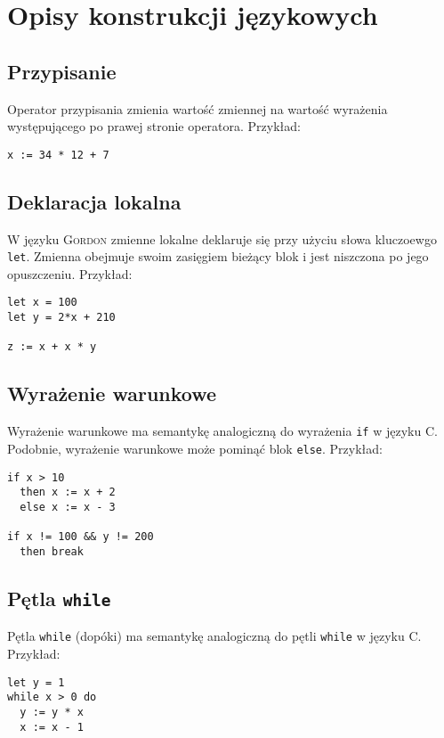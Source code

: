 \documentclass{documentation}
\begin{document}
\section{Opisy konstrukcji językowych}

\subsection{Przypisanie}
Operator przypisania zmienia wartość zmiennej na wartość wyrażenia występującego
po prawej stronie operatora. Przykład:
\begin{verbatim}
x := 34 * 12 + 7
\end{verbatim}

\subsection{Deklaracja lokalna}
W języku \textsc{Gordon} zmienne lokalne deklaruje się przy użyciu słowa kluczoewgo
\texttt{let}. Zmienna obejmuje swoim zasięgiem bieżący blok i jest niszczona po
jego opuszczeniu. Przykład:

\begin{verbatim}
let x = 100
let y = 2*x + 210

z := x + x * y
\end{verbatim}

\subsection{Wyrażenie warunkowe}
Wyrażenie warunkowe ma semantykę analogiczną do wyrażenia \texttt{if}
w języku \textsc{C}. Podobnie, wyrażenie warunkowe może pominąć blok \texttt{else}.
Przykład:

\begin{verbatim}
if x > 10
  then x := x + 2
  else x := x - 3

if x != 100 && y != 200
  then break
\end{verbatim}

\subsection{Pętla \texttt{while}}
Pętla \texttt{while} (dopóki) ma semantykę analogiczną do pętli \texttt{while} w języku
\textsc{C}. Przykład:

\begin{verbatim}
let y = 1
while x > 0 do
  y := y * x
  x := x - 1
\end{verbatim}
\end{document}
